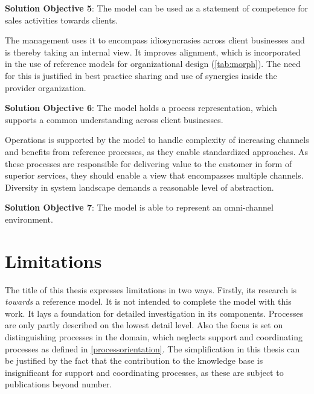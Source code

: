\hfill\begin{minipage}{\dimexpr\textwidth-1.2cm}
	\textbf{Solution Objective 5}: The model can be used as a statement of competence for sales activities towards clients.
	
\end{minipage}

 The management uses it to encompass idiosyncrasies across client businesses and is thereby taking an internal view. It improves alignment, which is incorporated in the use of reference models for organizational design (\cf \Tab \ref{tab:morph}). The need for this is justified in best practice sharing and use of synergies inside the provider organization.
 
 
\hfill\begin{minipage}{\dimexpr\textwidth-1.2cm}
 \textbf{Solution Objective 6}: The model holds a process representation, which supports a common understanding across client businesses. 
 
\end{minipage}


 Operations is supported by the model to handle complexity of increasing channels and benefits from reference processes, as they enable standardized approaches. As these processes are responsible for delivering value to the customer in form of superior services, they should enable a view that encompasses multiple channels. Diversity in system landscape demands a reasonable level of abstraction. 
 
	\hfill\begin{minipage}{\dimexpr\textwidth-1.2cm}
	\textbf{Solution Objective 7}: The model is able to represent an omni-channel environment. 
\end{minipage}

\section{Limitations}

The title of this thesis expresses limitations in two ways. Firstly, its research is \textit{towards} a reference model. It is not intended to complete the model with this work. It lays a foundation for detailed investigation in its components. Processes are only partly described on the lowest detail level. Also the focus is set on distinguishing processes in the domain, which neglects support and coordinating processes as defined in \ref{processorientation}. The simplification in this thesis can be justified by the fact that the contribution to the knowledge base is insignificant for support and coordinating processes, as these are subject to publications beyond number. 


